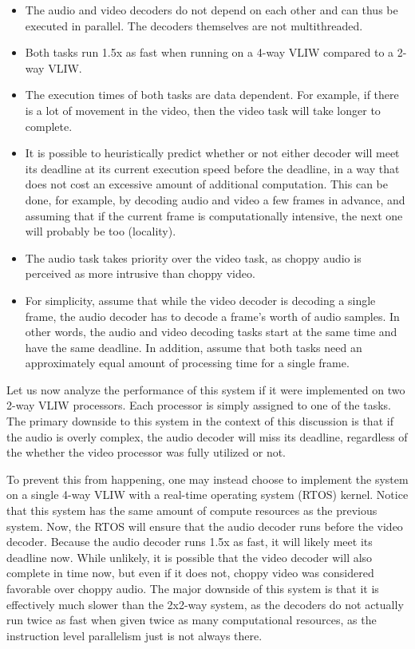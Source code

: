 \begin{itemize}

\item The audio and video decoders do not depend on each other and can thus be
executed in parallel. The decoders themselves are not multithreaded.

\item Both tasks run 1.5x as fast when running on a 4-way VLIW compared to a
2-way VLIW. %

\item The execution times of both tasks are data dependent. For example, if
there is a lot of movement in the video, then the video task will take longer
to complete.

\item It is possible to heuristically predict whether or not either decoder
will meet its deadline at its current execution speed before the deadline, in
a way that does not cost an excessive amount of additional computation. This
can be done, for example, by decoding audio and video a few frames in advance,
and assuming that if the current frame is computationally intensive, the next
one will probably be too (locality).

\item The audio task takes priority over the video task, as choppy audio is 
perceived as more intrusive than choppy video.

\item For simplicity, assume that while the video decoder is decoding a single
frame, the audio decoder has to decode a frame's worth of audio samples. In
other words, the audio and video decoding tasks start at the same time and have
the same deadline. In addition, assume that both tasks need an approximately
equal amount of processing time for a single frame.

\end{itemize}

\noindent Let us now analyze the performance of this system if it were 
implemented on two 2-way VLIW processors. Each processor is simply assigned to 
one of the tasks. The primary downside to this system in the context of this 
discussion is that if the audio is overly complex, the audio decoder will miss 
its deadline, regardless of the whether the video processor was fully utilized 
or not.

To prevent this from happening, one may instead choose to implement the system
on a single 4-way VLIW with a real-time operating system (RTOS) kernel. Notice
that this system has the same amount of compute resources as the previous
system. Now, the RTOS will ensure that the audio decoder runs before the video
decoder. Because the audio decoder runs 1.5x as fast, it will likely meet its
deadline now. While unlikely, it is possible that the video decoder will also
complete in time now, but even if it does not, choppy video was considered
favorable over choppy audio. The major downside of this system is that it is
effectively much slower than the 2x2-way system, as the decoders do not
actually run twice as fast when given twice as many computational resources,
as the instruction level parallelism just is not always there.

